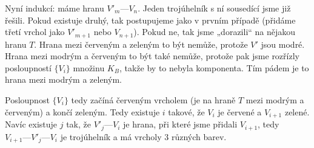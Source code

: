 \documentclass[12pt]{article}					%
\begin{document}
\begin{priklad}[2.3]
\begin{dukazin}
		Nyní indukcí: máme hranu $V'_m — V_n$. Jeden trojúhelník s ní sousedící jsme již řešili. Pokud existuje druhý, tak postupujeme jako v prvním případě (přidáme třetí vrchol jako $V'_{m+1}$ nebo $V_{n+1}$). Pokud ne, tak jsme „dorazili“ na nějakou hranu $T$. Hrana mezi červeným a zeleným to být nemůže, protože $V'$ jsou modré. Hrana mezi modrým a červeným to být také nemůže, protože pak jsme rozřízly posloupností $\{V_i\}$ množinu $K_B$, takže by to nebyla komponenta. Tím pádem je to hrana mezi modrým a zeleným.

		Posloupnost $\{V_i\}$ tedy začíná červeným vrcholem (je na hraně $T$ mezi modrým a červeným) a končí zeleným. Tedy existuje $i$ takové, že $V_i$ je červené a $V_{i+1}$ zelené. Navíc existuje $j$ tak, že $V'_j — V_i$ je hrana, při které jsme přidali $V_{i+1}$, tedy $V_{i+1} — V'_j — V_i$ je trojúhelník a má vrcholy 3 různých barev.
	\end{dukazin}
\end{priklad}
\end{document}
